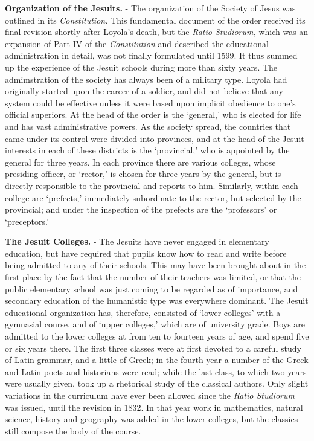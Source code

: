 \documentclass[
]{book}
\begin{document}
\textbf{Organization of the Jesuits.} - The organization of the Society of Jesus was outlined in its \emph{Constitution.} This fundamental document of the order received its final revision shortly after Loyola's death, but the \emph{Ratio Studiorum,} which was an expansion of Part IV of the \emph{Constitution} and described the educational administration in detail, was not finally formulated until 1599. It thus summed up the experience of the Jesuit schools during more than sixty years. The admimstration of the society has always been of a military type. Loyola had originally started upon the career of a soldier, and did not believe that any system could be effective unless it were based upon implicit obedience to one's official superiors. At the head of the order is the `general,' who is elected for life and has vast administrative powers. As the society spread, the countries that came under its control were divided into provinces, and at the head of the Jesuit interests in each of these districts is the `provincial,' who is appointed by the general for three years. In each province there are various colleges, whose presiding officer, or `rector,' is chosen for three years by the general, but is directly responsible to the provincial and reports to him. Similarly, within each college are `prefects,' immediately subordinate to the rector, but selected by the provincial; and under the inspection of the prefects are the `professors' or `preceptors.'

\textbf{The Jesuit Colleges.} - The Jesuits have never engaged in elementary education, but have required that pupils know how to read and write before being admitted to any of their schools. This may have been brought about in the first place by the fact that the number of their teachers was limited, or that the public elementary school was just coming to be regarded as of importance, and secondary education of the humanistic type was everywhere dominant. The Jesuit educational organization has, therefore, consisted of `lower colleges' with a gymnasial course, and of `upper colleges,' which are of university grade. Boys are admitted to the lower colleges at from ten to fourteen years of age, and spend five or six years there. The first three classes were at first devoted to a careful study of Latin grammar, and a little of Greek; in the fourth year a number of the Greek and Latin poets and historians were read; while the last class, to which two years were usually given, took up a rhetorical study of the classical authors. Only slight variations in the curriculum have ever been allowed since the \emph{Ratio Studiorum} was issued, until the revision in 1832. In that year work in mathematics, natural science, history and geography was added in the lower colleges, but the classics still compose the body of the course.
\end{document}
